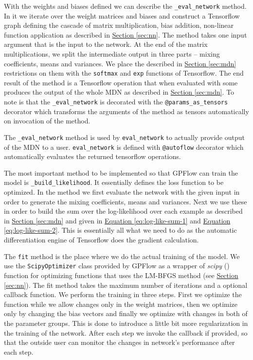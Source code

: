 \documentclass[12pt,a4paper,twoside]{scrartcl}
\numberwithin{equation}{section}
\newcommand{\refsec}[1]{\hyperref[#1]{Section \ref*{#1}}}
\renewcommand*{\refeq}[1]{\hyperref[#1]{Equation \ref*{#1}}}
\begin{document}
With the weights and biases defined we can describe the \texttt{\_eval\_network} method. In it we iterate over the weight matrices and biases and construct a Tensorflow graph defining the cascade of matrix multiplication, bias addition, non-linear function application as described in \refsec{sec:nn}. The method takes one input argument that is the input to the network. At the end of the matrix multiplications, we split the intermediate output in three parts -- mixing coefficients, means and variances. We place the described in \refsec{sec:mdn} restrictions on them with the \texttt{softmax} and \texttt{exp} functions of Tensorflow. The end result of the method is a Tensorflow operation that when evaluated with some produces the output of the whole MDN as described in \refsec{sec:mdn}. To note is that the \texttt{\_eval\_network} is decorated with the \texttt{@params\_as\_tensors} decorator which transforms the arguments of the method as tensors automatically on invocation of the method.

The \texttt{\_eval\_network} method is used by \texttt{eval\_network} to actually provide output of the MDN to a user. \texttt{eval\_network} is defined with \texttt{@autoflow} decorator which automatically evaluates the returned tensorflow operations.

The most important method to be implemented so that GPFlow can train the model is \texttt{\_build\_likelihood}. It essentially defines the loss function to be optimized. In the method we first evaluate the network with the given input in order to generate the mixing coefficients, means and variances. Next we use these in order to build the sum over the log-likelihood over each example as described in \refsec{sec:mdn} and given in \refeq{eq:log-like-sum-1} and \refeq{eq:log-like-sum-2}. This is essentially all what we need to do as the automatic differentiation engine of Tensorflow does the gradient calculation. 

The \texttt{fit} method is the place where we do the actual training of the model. We use the \texttt{ScipyOptimizer} class provided by GPFlow as a wrapper of \emph{scipy} (\cite{scipy}) function for optimizing functions that uses the LM-BFGS method (see \refsec{sec:nn}). The fit method takes the maximum number of iterations and a optional callback function. We perform the training in three steps. First we optimize the function while we allow changes only in the weight matrices, then we optimize only by changing the bias vectors and finally we optimize with changes in both of the parameter groups. This is done to introduce a little bit more regularization in the training of the network. After each step we invoke the callback if provided, so that the outside user can monitor the changes in network's performance after each step.
\end{document}

